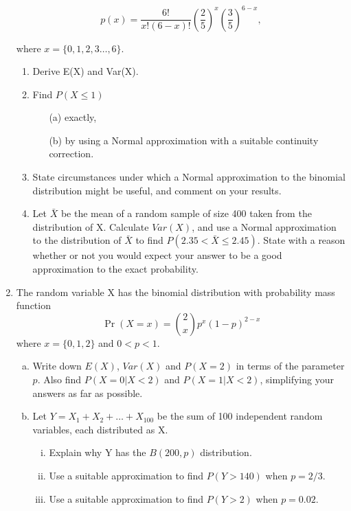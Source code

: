 \documentclass[a4paper,12pt]{article}
\begin{document}
\begin{enumerate}
\[ p(x) = \frac{6!}{x!(6-x)!}  \left( \frac{2}{5}\right) ^{x}  \left( \frac{3}{5}\right) ^{6-x}, \]

where $x =\{0,1,2,3\ldots,6\}$.

\begin{enumerate}
\item Derive E(X) and Var(X).
\item Find $P(X \leq 1)$
\begin{itemize}
\item[(a)] exactly,
\item[(b)] by using a Normal approximation with a suitable continuity correction.
\end{itemize}

\item State circumstances under which a Normal approximation to the binomial distribution might be useful, and comment on your results.
\item Let $\bar{X}$ be the mean of a random sample of size 400 taken from the distribution of X. Calculate $Var(X)$, and use a Normal approximation to the distribution of $\bar{X}$ to find $P(2.35< \bar{X} \leq 2.45)$. State with a reason whether or not you would expect your answer to be a good approximation to the exact probability.
\end{enumerate}


\item  The random variable X has the binomial distribution with probability mass function
$$ {\displaystyle \Pr(X=x)={2 \choose x}p^{x}(1-p)^{2-x}} $$ where $x = \{0, 1, 2\}$ and $0 < p < 1$.


\begin{enumerate}[(a)]
\item Write down $E(X)$, $Var(X)$ and $P(X = 2)$ in terms of the parameter $p$. Also find $P(X = 0 | X < 2)$ and $P(X = 1 | X < 2)$, simplifying your answers as far as possible.

\item Let $Y = X_1 + X_2 + \ldots + X_{100}$ be the sum of 100 independent random variables, each distributed as X.
\begin{enumerate}[(i)]
\item Explain why Y has the $B(200, p)$ distribution.

\item Use a suitable approximation to find $P(Y > 140)$ when $p = 2/3$.
\item Use a suitable approximation to find $P(Y > 2)$ when $p = 0.02$.


\end{enumerate}
\end{enumerate}
\end{enumerate}
\end{document}
